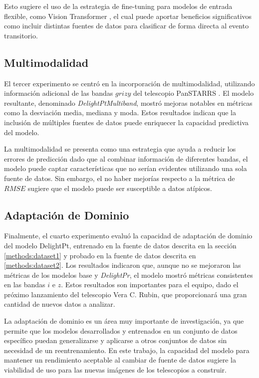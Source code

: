 \documentclass[../tesis.tex]{subfiles}
\begin{document}
Esto sugiere el uso de la estrategia de fine-tuning para modelos de entrada flexible, como Vision Transformer \cite{ViT}, el cual puede aportar beneficios significativos como incluir distintas fuentes de datos para clasificar de forma directa al evento transitorio.

\subsection{Multimodalidad}
El tercer experimento se centró en la incorporación de multimodalidad, utilizando información adicional de las bandas $grizy$ del telescopio PanSTARRS \cite{panstarrs}. El modelo resultante, denominado \textit{DelightPtMultiband}, mostró mejoras notables en métricas como la desviación media, mediana y moda. Estos resultados indican que la inclusión de múltiples fuentes de datos puede enriquecer la capacidad predictiva del modelo.\par\null\par

La multimodalidad se presenta como una estrategia que ayuda a reducir los errores de predicción dado que al combinar información de diferentes bandas, el modelo puede captar características que no serían evidentes utilizando una sola fuente de datos. Sin embargo, el no haber mejorías respecto a la métrica de $RMSE$ sugiere que el modelo puede ser susceptible a datos atípicos.

\subsection{Adaptación de Dominio}
Finalmente, el cuarto experimento evaluó la capacidad de adaptación de dominio del modelo DelightPt, entrenado en la fuente de datos descrita en la sección \ref{methods:dataset1} y probado en la fuente de datos descrita en \ref{methods:dataset2}. Los resultados indicaron que, aunque no se mejoraron las métricas de los modelos base y \textit{DelightPr}, el modelo mostró métricas consistentes en las bandas $i$ e $z$. Estos resultados son importantes para el equipo, dado el próximo lanzamiento del telescopio Vera C. Rubin, que proporcionará una gran cantidad de nuevos datos a analizar.\par\null\par

La adaptación de dominio es un área muy importante de investigación, ya que permite que los modelos desarrollados y entrenados en un conjunto de datos específico puedan generalizarse y aplicarse a otros conjuntos de datos sin necesidad de un reentrenamiento. En este trabajo, la capacidad del modelo para mantener un rendimiento aceptable al cambiar de fuente de datos sugiere la viabilidad de uso para las nuevas imágenes de los telescopios a construir.
\end{document}
